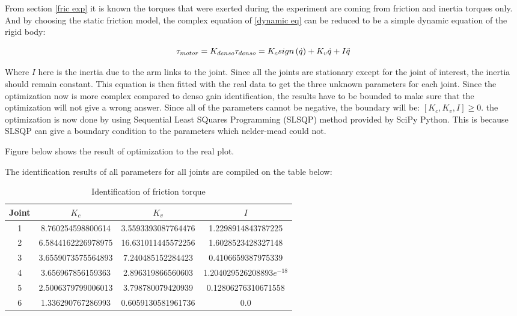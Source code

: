 From section \ref{fric exp} it is known the torques that were exerted during the experiment are coming from friction and inertia torques only. And by choosing the static friction model, the complex equation of \ref{dynamic eq} can be reduced to be a simple dynamic equation of the rigid body:

\begin{equation}
  \tau_{motor} = K_{denso} \tau_{denso} = K_{c} sign\left(\dot{q}\right) + K_{v} \dot{q} + I\ddot{q} \\
\end{equation}

Where $ I $ here is the inertia due to the arm links to the joint. Since all the joints are stationary except for the joint of interest, the inertia should remain constant. This equation is then fitted with the real data to get the three unknown parameters for each joint. Since the optimization now is more complex compared to denso gain identification, the results have to be bounded to make sure that the optimization will not give a wrong answer. Since all of the parameters cannot be negative, the boundary will be: $[K_{c}, K_{v}, I] \geq 0$. the optimization is now done by using Sequential Least SQuares Programming (SLSQP) method provided by SciPy Python. This is because SLSQP can give a boundary condition to the parameters which nelder-mead could not.


Figure below shows the result of optimization to the real plot. 


The identification results of all parameters for all joints are compiled on the table below: 
\begin{table}[H]
    \centering
    \begin{tabular}{| c | c | c | c |}
    \hline
    Joint & $K_{c}$ & $K_{v}$ & $I$ \\ \hline
    1 & 8.760254598800614   & 3.5593393087764476  & 1.2298914843787225\\ \hline
    2 & 6.5844162226978975  & 16.631011445572256  & 1.6028523428327148\\ \hline
    3 & 3.6559073575564893  & 7.240485152284423   & 0.4106659387975339\\ \hline
    4 & 3.656967856159363   & 2.896319866560603   & 1.204029526208893$e^{-18}$\\ \hline
    5 & 2.5006379799006013  & 3.798780079420939   & 0.12806276310671558\\ \hline
    6 & 1.336290767286993   & 0.6059130581961736  & 0.0                \\ \hline
    \end{tabular}
    \caption{Identification of friction torque}
    \label{table:friction}
\end{table}
